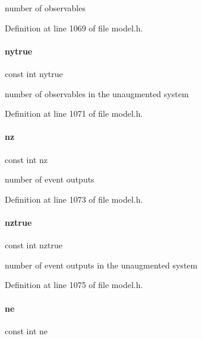 number of observables 

Definition at line 1069 of file model.\+h.

\mbox{\label{classamici_1_1_model_a54bcfe56ad0df183516d096adf4e0b26}} 
\paragraph{\texorpdfstring{nytrue}{nytrue}}
{\footnotesize\ttfamily const int nytrue}

number of observables in the unaugmented system 

Definition at line 1071 of file model.\+h.

\mbox{\label{classamici_1_1_model_aa406c307f97060d218bc1fe594dfd08f}} 
\paragraph{\texorpdfstring{nz}{nz}}
{\footnotesize\ttfamily const int nz}

number of event outputs 

Definition at line 1073 of file model.\+h.

\mbox{\label{classamici_1_1_model_a9a451378ba5572ef7a3fd4dd89e1c227}} 
\paragraph{\texorpdfstring{nztrue}{nztrue}}
{\footnotesize\ttfamily const int nztrue}

number of event outputs in the unaugmented system 

Definition at line 1075 of file model.\+h.

\mbox{\label{classamici_1_1_model_a07d5274358ec39bfec473cd212a3cb78}} 
\paragraph{\texorpdfstring{ne}{ne}}
{\footnotesize\ttfamily const int ne}

